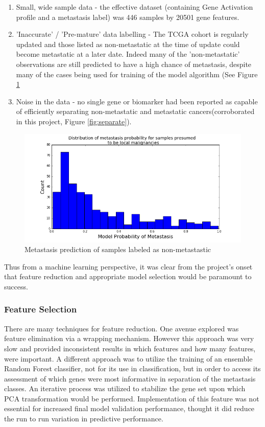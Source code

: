 \documentclass[final]{article}
\begin{document}
\begin{enumerate}
\item Small, wide sample data - the effective
dataset (containing Gene Activation profile and a metastasis label) was 446
samples by 20501 gene features.
\item 'Inaccurate' / 'Pre-mature' data labelling -
The TCGA cohort is regularly updated and those listed as non-metastatic at the
time of update could become metastatic at a later date.  Indeed many of the 'non-metastatic'
observations are still predicted to have a high chance of metastasis, despite many of the cases being used for
training of the model algorithm (See Figure \ref{fig:n0}
\item Noise in the data -
no single gene or biomarker had been reported as capable of efficiently
separating non-metastatic and metastatic cancers(corroborated in this project,
Figure \ref{fig:separate}).
\end{enumerate}

\begin{figure}
  \centering
  \includegraphics[scale=0.5]{N0Analysis}
  \caption{\label{fig:n0} Metastasis prediction of samples labeled as non-metastastic}
\end{figure}

Thus from a machine learning perspective, it was clear from the project's onset
that feature reduction and appropriate model selection would be paramount to
success.

\subsubsection{Feature Selection}

There are many techniques for feature reduction.  One avenue explored was
feature elimination via a wrapping mechanism.  However this approach was very
slow and provided inconsistent results in which features and how many features,
were important. A different approach was to utilize the
training of an ensemble Random Forest classifier, not for its use in
classification, but in order to access its assessment of which genes were most
informative in separation of the metastasis classes.  An iterative process was
utilized to stabilize the gene set upon which PCA transformation would be performed. Implementation of this feature was not essential for increased final model
validation performance, thought it did reduce the run to run variation in predictive
performance.
\end{document}
